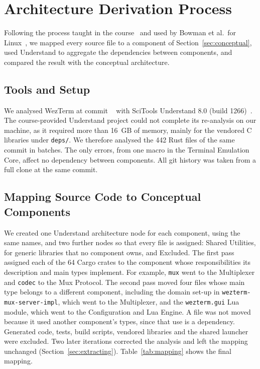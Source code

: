\section{Architecture Derivation Process}
\label{sec:derivation}
\providecommand{\depends}[1]{{\small\itshape\guillemotleft depends on #1\guillemotright}}


Following the process taught in the course~\cite{reflexion-models} and used by Bowman et al.\ for Linux~\cite{linux-concrete}, we mapped every source file to a component of Section~\ref{sec:conceptual}, used Understand to aggregate the dependencies between components, and compared the result with the conceptual architecture.

\subsection{Tools and Setup}
\label{sec:setup}

We analysed WezTerm at commit \pinnedcommit{}~\cite{wezterm-repo} with SciTools Understand 8.0 (build 1266)~\cite{understand}. The course-provided Understand project could not complete its re-analysis on our machine, as it required more than 16~GB of memory, mainly for the vendored C libraries under \texttt{deps/}. We therefore analysed the 442 Rust files of the same commit in batches. The only errors, from one macro in the Terminal Emulation Core, affect no dependency between components. All git history was taken from a full clone at the same commit.

\subsection{Mapping Source Code to Conceptual Components}
\label{sec:mapping}

We created one Understand architecture node for each component, using the same names, and two further nodes so that every file is assigned: Shared Utilities, for generic libraries that no component owns, and Excluded. The first pass assigned each of the 64 Cargo crates to the component whose responsibilities its description and main types implement. For example, \texttt{mux} went to the Multiplexer and \texttt{codec} to the Mux Protocol. The second pass moved four files whose main type belongs to a different component, including the domain set-up in \texttt{wezterm-mux-server-impl}, which went to the Multiplexer, and the \texttt{wezterm.gui} Lua module, which went to the Configuration and Lua Engine. A file was not moved because it used another component's types, since that use is a dependency. Generated code, tests, build scripts, vendored libraries and the shared launcher were excluded. Two later iterations corrected the analysis and left the mapping unchanged (Section~\ref{sec:extracting}). Table~\ref{tab:mapping} shows the final mapping.


